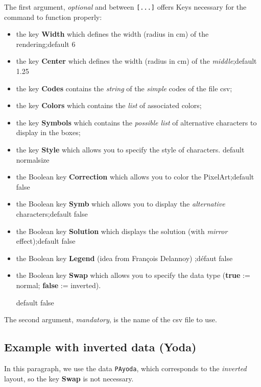 \documentclass{article}
\newcommand\Cle[1]{{\bfseries\sffamily\textlangle #1\textrangle}}
\begin{document}
The first argument, \textit{optional} and between \texttt{[...]} offers \textsf{Keys} necessary for the command to function properly:

\begin{itemize}
	\item the key \Cle{Width} which defines the width (radius in cm) of the rendering;\hfill{}default \textsf{6}
	\item the key \Cle{Center} which defines the width (radius in cm) of the \textit{middle};\hfill{}default \textsf{1.25}
	\item the key \Cle{Codes} contains the \textit{string} of the \textit{simple} codes of the file \textsf{csv};
	\item the key \Cle{Colors} which contains the \textit{list} of associated colors;
	\item the key \Cle{Symbols} which contains the \textit{possible list} of alternative characters to display in the boxes;
	\item the key \Cle{Style} which allows you to specify the style of characters. \hfill{}default \textsf{normalsize}
	\item the Boolean key \Cle{Correction} which allows you to color the PixelArt;\hfill{}default \textsf{false}
	\item the Boolean key \Cle{Symb} which allows you to display the \textit{alternative} characters;\hfill{}default \textsf{false}
	\item the Boolean key \Cle{Solution} which displays the solution (with \textit{mirror} effect);\hfill{}default \textsf{false}
	\item the Boolean key \Cle{Legend} (idea from François Delannoy) ;\hfill{}défaut \textsf{false}
	\item the Boolean key \Cle{Swap} which allows you to specify the data type (\Cle{true} := normal; \Cle{false} := inverted).
	
	\hfill{}default \textsf{false}
\end{itemize}

The second argument, \textit{mandatory}, is the name of the \textsf{csv} file to use.

\pagebreak

\subsection{Example with inverted data (Yoda)}

In this paragraph, we use the data \texttt{PAyoda}, which corresponds to the \textit{inverted} layout, so the key \Cle{Swap} is not necessary.
\end{document}
